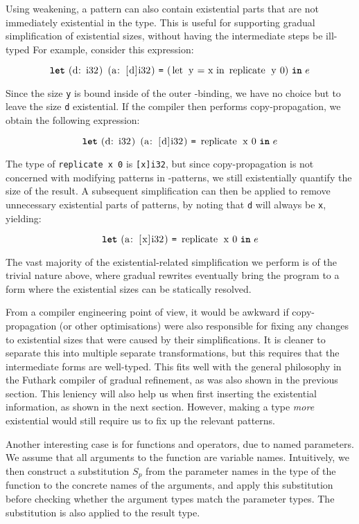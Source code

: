 Using weakening, a pattern can also contain existential parts that are
not immediately existential in the type.  This is useful for
supporting gradual simplification of existential sizes, without having
the intermediate steps be ill-typed For example, consider this
expression:

\[
\Let{\mbox{\lstinline{(d: i32) (a: [d]i32)}}}{\mbox{\lstinline{(let y = x in replicate y 0)}}}{e}
\]

Since the size \texttt{y} is bound inside of the outer
-binding, we have no choice but to leave the size \texttt{d}
existential.  If the compiler then performs copy-propagation, we
obtain the following expression:

\[
\Let{\mbox{\lstinline{(d: i32) (a: [d]i32)}}}{\mbox{\lstinline{replicate x 0}}}{e}
\]

The type of \lstinline{replicate x 0} is \lstinline{[x]i32}, but since
copy-propagation is not concerned with modifying patterns in
-patterns, we still existentially quantify the size of the
result.  A subsequent simplification can then be applied to remove
unnecessary existential parts of patterns, by noting that \texttt{d}
will always be \texttt{x}, yielding:

\[
\Let{\mbox{\lstinline{(a: [x]i32)}}}{\mbox{\lstinline{replicate x 0}}}{e}
\]

The vast majority of the existential-related simplification we perform
is of the trivial nature above, where gradual rewrites eventually
bring the program to a form where the existential sizes can be
statically resolved.

From a compiler engineering point of view, it would be awkward if
copy-propagation (or other optimisations) were also responsible for
fixing any changes to existential sizes that were caused by their
simplifications.  It is cleaner to separate this into multiple
separate transformations, but this requires that the intermediate
forms are well-typed.  This fits well with the general philosophy in
the Futhark compiler of gradual refinement, as was also shown in the
previous section.  This leniency will also help us when first
inserting the existential information, as shown in the next section.
However, making a type \textit{more} existential would still require
us to fix up the relevant patterns.

Another interesting case is for functions and operators, due to named
parameters.  We assume that all arguments to the function are variable
names.  Intuitively, we then construct a substitution $S_{p}$ from the
parameter names in the type of the function to the concrete names of
the arguments, and apply this substitution before checking whether the
argument types match the parameter types.  The substitution is also
applied to the result type.

